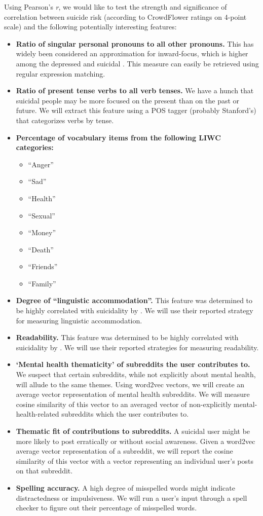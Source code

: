 \documentclass[11pt,letterpaper]{article}
\newcommand{\3}{$|$}
\newcommand{\Bf}{\textbf}
\begin{document}
Using Pearson's \emph{r}, we would like to test the strength and significance of correlation between suicide risk (according to CrowdFlower ratings on 4-point scale) and the following potentially interesting features:
\begin{itemize}
\item \Bf{Ratio of singular personal pronouns to all other pronouns.} This has widely been considered an approximation for inward-focus, which is higher among the depressed and suicidal \citep{Vioules18}. This measure can easily be retrieved using regular expression matching.
\item \Bf{Ratio of present tense verbs to all verb tenses.} We have a hunch that suicidal people may be more focused on the present than on the past or future. We will extract this feature using a POS tagger (probably Stanford's) that categorizes verbs by tense.
\item \Bf{Percentage of vocabulary items from the following LIWC categories:}
	\begin{itemize}
	\item ``Anger'' 
	\item ``Sad''
	\item ``Health''
	\item ``Sexual''
	\item ``Money''
	\item ``Death''
	\item ``Friends''
	\item ``Family''
	\end{itemize}
\item \Bf{Degree of ``linguistic accommodation''.} This feature was determined to be highly correlated with suicidality by \citet{deChoudhury16}. We will use their reported strategy for measuring linguistic accommodation.
\item \Bf{Readability.} This feature was determined to be highly correlated with suicidality by \citet{deChoudhury16}. We will use their reported strategies for measuring readability.
\item \Bf{`Mental health thematicity' of subreddits the user contributes to.} We suspect that certain subreddits, while not explicitly about mental health, will allude to the same themes. Using word2vec vectors, we will create an average vector representation of mental health subreddits. We will measure cosine similarity of this vector to an averaged vector of non-explicitly mental-health-related subreddits which the user contributes to. 
\item \Bf{Thematic fit of contributions to subreddits.} A suicidal user might be more likely to post erratically or without social awareness. Given a word2vec average vector representation of a subreddit, we will report the cosine similarity of this vector with a vector representing an individual user's posts on that subreddit.
\item \Bf{Spelling accuracy.} A high degree of misspelled words might indicate distractedness or impulsiveness. We will run a user's input through a spell checker to figure out their percentage of misspelled words.
\end{itemize}
\end{document}
